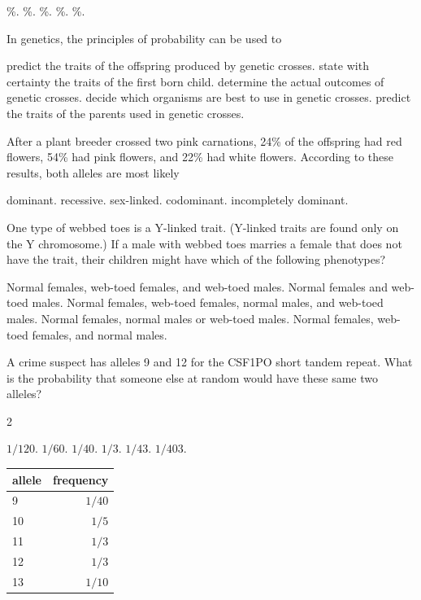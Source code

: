 \begin{choices}
\%.
\%.
\%.
\%.
\%.
\end{choices}

\question
In genetics, the principles of probability can be used to

\begin{choices}
\correctchoice predict the traits of the offspring produced by genetic crosses.
\choice state with certainty the traits of the first born child.
\choice determine the actual outcomes of genetic crosses.
\choice decide which organisms are best to use in genetic crosses.
\choice predict the traits of the parents used in genetic crosses.
\end{choices}

\question
After a plant breeder crossed two pink carnations, 24\% of the offspring had red flowers, 54\% had pink flowers, and 22\% had white flowers. According to these results, both alleles are most likely

\begin{choices}
\choice dominant.
\choice recessive.
\choice sex-linked.
\choice codominant.
\correctchoice incompletely dominant.
\end{choices}

\question
One type of webbed toes is a Y-linked trait. (Y-linked traits are found only on the Y chromosome.) If a male with webbed toes marries a female that does not have the trait, their children might have which of the following phenotypes?

\begin{choices}
\choice Normal females, web-toed females, and web-toed males.
\correctchoice Normal females and web-toed males.
\choice Normal females, web-toed females, normal males, and web-toed males.
\choice Normal females, normal males or web-toed males.
\choice Normal females, web-toed females, and normal males.
\end{choices}

\question
A crime suspect has alleles 9 and 12 for the CSF1PO short tandem repeat. What is the probability that someone else at random would have these same two alleles?  

\begin{multicols}{2}
\begin{choices}
\choice $1/120$.
\correctchoice $1/60$.
\choice $1/40$.
\choice $1/3$.
\choice $1/43$.
\choice $1/403$.
\end{choices}
\columnbreak
\begin{tabular}{lr}
\toprule
allele & frequency\\
\midrule
9 & $1/40$\\
10 & $1/5$\\
11 & $1/3$\\
12 & $1/3$\\
13 & $1/10$\\
\bottomrule
\end{tabular}
\end{multicols}

